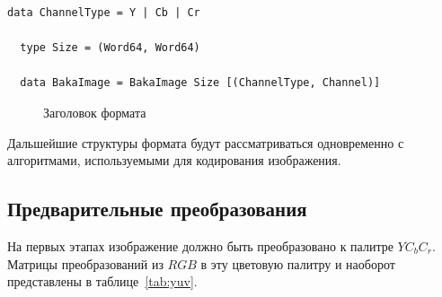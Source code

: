 \documentclass[a4paper,12pt]{article}
\numberwithin{equation}{section}
\begin{document}
\begin{lstlisting}[float=t,caption={Основной заголовок формата},label=lst:bakaimage]
  data ChannelType = Y | Cb | Cr

  type Size = (Word64, Word64)

  data BakaImage = BakaImage Size [(ChannelType, Channel)]
\end{lstlisting}

\begin{figure}[t]
  \centering
  
  \caption{Заголовок формата}
  \label{fig:bakaimage}
\end{figure}

Дальшейшие структуры формата будут рассматриваться одновременно с алгоритмами,
используемыми для кодирования изображения.

\subsection{Предварительные преобразования}

На первых этапах изображение должно быть преобразовано к палитре
$YC_bC_r$. Матрицы преобразований из $RGB$ в эту цветовую палитру и наоборот
представлены в таблице~\ref{tab:yuv}.
\end{document}
